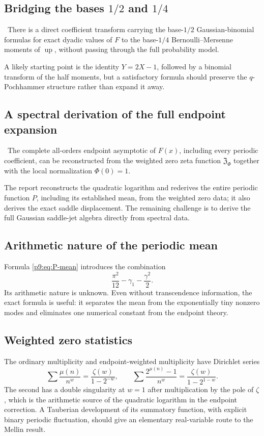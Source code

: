 \documentclass[11pt]{article}
\numberwithin{equation}{section}
\theoremstyle{definition}
\theoremstyle{remark}
\newcommand{\Up}{\operatorname{up}}
\begin{document}
\subsection{Bridging the bases $1/2$ and $1/4$}
\begin{conjecture}
\statusC\ There is a direct coefficient transform carrying the base-$1/2$ Gaussian-binomial
formulas for exact dyadic values of $F$ to the base-$1/4$ Bernoulli--Mersenne moments of
$\Up$, without passing through the full probability model.
\end{conjecture}
A likely starting point is the identity $Y=2X-1$, followed by a binomial transform of the
half moments, but a satisfactory formula should preserve the $q$-Pochhammer structure
rather than expand it away.

\subsection{A spectral derivation of the full endpoint expansion}
\begin{conjecture}
\statusC\ The complete all-orders endpoint asymptotic of $F(x)$, including every periodic
coefficient, can be reconstructed from the weighted zero zeta function
$\mathfrak Z_\Phi$ together with the local normalization $\Phi(0)=1$.
\end{conjecture}
The report reconstructs the quadratic logarithm and rederives the entire periodic function
$P$, including its established mean, from the weighted zero data; it also derives the exact
saddle displacement.  The remaining challenge is to derive the full
Gaussian saddle-jet algebra directly from spectral data.

\subsection{Arithmetic nature of the periodic mean}
Formula \eqref{p9:eq:P-mean} introduces the combination
\[
 \frac{\pi^2}{12}-\gamma_1-\frac{\gamma^2}{2}.
\]
Its arithmetic nature is unknown.  Even without transcendence information, the exact
formula is useful: it separates the mean from the exponentially tiny nonzero modes and
eliminates one numerical constant from the endpoint theory.

\subsection{Weighted zero statistics}
The ordinary multiplicity and endpoint-weighted multiplicity have Dirichlet series
\[
 \sum\frac{\mu(n)}{n^w}=\frac{\zeta(w)}{1-2^{-w}},
 \qquad
 \sum\frac{2^{\mu(n)}-1}{n^w}=\frac{\zeta(w)}{1-2^{1-w}}.
\]
The second has a double singularity at $w=1$ after multiplication by the pole of $\zeta$,
which is the arithmetic source of the quadratic logarithm in the endpoint correction.
A Tauberian development of its summatory function, with explicit binary periodic
fluctuation, should give an elementary real-variable route to the Mellin result.
\end{document}
